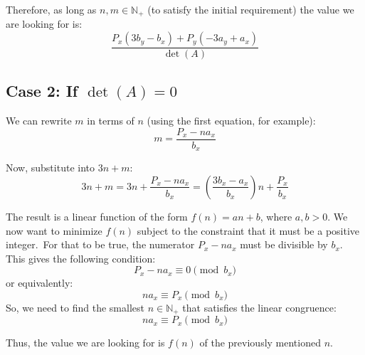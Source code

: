 \documentclass{article}
\newcommand{\intpos}{\mathbb{N}_+}
\begin{document}
Therefore, as long as \( n, m \in \intpos \) (to satisfy the initial requirement) the value we are looking for is:
\[
  \frac{P_x(3b_y - b_x) + P_y(-3a_y + a_x)}{\det(A)}
\]

\subsection*{Case 2: If \( \det(A) = 0 \)}

We can rewrite \( m \) in terms of \( n \) (using the first equation, for example):
\[
  m = \frac{P_x - n a_x}{b_x}
\]

Now, substitute into \( 3n + m \):
\[
  3n + m = 3n + \frac{P_x - n a_x}{b_x} = \left( \frac{3 b_x - a_x}{b_x} \right) n + \frac{P_x}{b_x}
\]

The result is a linear function of the form \( f(n) = an + b \), where \( a, b > 0 \). We now want to minimize \( f(n) \) subject to the constraint that it must be a positive integer.\
For that to be true, the numerator \( P_x - n a_x \) must be divisible by \( b_x \). This gives the following condition:
\[
P_x - n a_x \equiv 0 \pmod{b_x}
\]
or equivalently:
\[
n a_x \equiv P_x \pmod{b_x}
\]
So, we need to find the smallest \( n \in \intpos \) that satisfies the linear congruence:
\[
n a_x \equiv P_x \pmod{b_x}
\]

Thus, the value we are looking for is \( f(n) \) of the previously mentioned \( n \).
\end{document}
